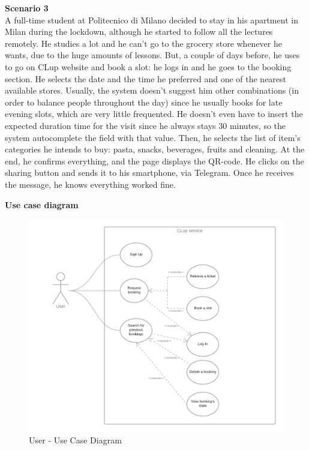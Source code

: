 \documentclass[table, 12pt]{article}
\begin{document}
\begin{minipage}{\textwidth}
    \textbf{Scenario 3}\\
    A full-time student at Politecnico di Milano decided to stay in his apartment in Milan during the lockdown, although he started to follow all the lectures remotely. He studies a lot and he can't go to the grocery store whenever he wants, due to the huge amounts of lessons. But, a couple of days before, he uses to go on CLup website and book a slot: he logs in and he goes to the booking section. He selects the date and the time he preferred and one of the nearest available stores. Usually, the system doesn't suggest him other combinations (in order to balance people throughout the day) since he usually books for late evening slots, which are very little frequented. He doesn't even have to insert the expected duration time for the visit since he always stays 30 minutes, so the system autocomplete the field with that value. Then, he selects the list of item's categories he intends to buy: pasta, snacks, beverages, fruits and cleaning. At the end, he confirms everything, and the page displays the QR-code. He clicks on the sharing button and sends it to his smartphone, via Telegram. Once he receives the message, he knows everything worked fine.\\
\end{minipage}

\begin{minipage}{\textwidth}
    \textbf{Use case diagram}
    \begin{figure}[H]
        \begin{center}
            \includegraphics[width=\textwidth]{assets/use_case_diagram_user.png}
            \caption{User - Use Case Diagram}
        \end{center}
    \end{figure}
\end{minipage}
\end{document}
